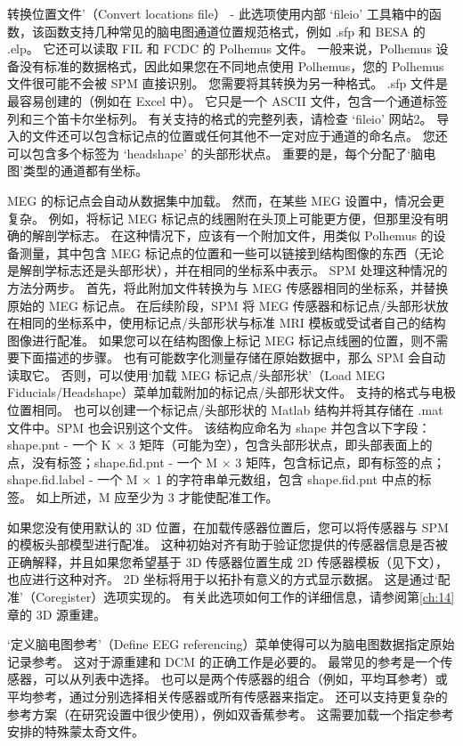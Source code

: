 转换位置文件’（Convert locations file） - 此选项使用内部 ‘fileio’ 工具箱中的函数，该函数支持几种常见的脑电图通道位置规范格式，例如 .sfp 和 BESA 的 .elp。
它还可以读取 FIL 和 FCDC 的 Polhemus 文件。
一般来说，Polhemus 设备没有标准的数据格式，因此如果您在不同地点使用 Polhemus，您的 Polhemus 文件很可能不会被 SPM 直接识别。
您需要将其转换为另一种格式。
.sfp 文件是最容易创建的（例如在 Excel 中）。
它只是一个 ASCII 文件，包含一个通道标签列和三个笛卡尔坐标列。
有关支持的格式的完整列表，请检查 ‘fileio’ 网站2。
导入的文件还可以包含标记点的位置或任何其他不一定对应于通道的命名点。
您还可以包含多个标签为 ‘headshape’ 的头部形状点。
重要的是，每个分配了‘脑电图’类型的通道都有坐标。


MEG 的标记点会自动从数据集中加载。
然而，在某些 MEG 设置中，情况会更复杂。
例如，将标记 MEG 标记点的线圈附在头顶上可能更方便，但那里没有明确的解剖学标志。
在这种情况下，应该有一个附加文件，用类似 Polhemus 的设备测量，其中包含 MEG 标记点的位置和一些可以链接到结构图像的东西（无论是解剖学标志还是头部形状），并在相同的坐标系中表示。
SPM 处理这种情况的方法分两步。
首先，将此附加文件转换为与 MEG 传感器相同的坐标系，并替换原始的 MEG 标记点。
在后续阶段，SPM 将 MEG 传感器和标记点/头部形状放在相同的坐标系中，使用标记点/头部形状与标准 MRI 模板或受试者自己的结构图像进行配准。
如果您可以在结构图像上标记 MEG 标记点线圈的位置，则不需要下面描述的步骤。
也有可能数字化测量存储在原始数据中，那么 SPM 会自动读取它。
否则，可以使用‘加载 MEG 标记点/头部形状’（Load MEG Fiducials/Headshape）菜单加载附加的标记点/头部形状文件。
支持的格式与电极位置相同。
也可以创建一个标记点/头部形状的 Matlab 结构并将其存储在 .mat 文件中。SPM 也会识别这个文件。
该结构应命名为 shape 并包含以下字段：shape.pnt - 一个 K × 3 矩阵（可能为空），包含头部形状点，即头部表面上的点，没有标签；shape.fid.pnt - 一个 M × 3 矩阵，包含标记点，即有标签的点；shape.fid.label - 一个 M × 1 的字符串单元数组，包含 shape.fid.pnt 中点的标签。
如上所述，M 应至少为 3 才能使配准工作。


如果您没有使用默认的 3D 位置，在加载传感器位置后，您可以将传感器与 SPM 的模板头部模型进行配准。
这种初始对齐有助于验证您提供的传感器信息是否被正确解释，并且如果您希望基于 3D 传感器位置生成 2D 传感器模板（见下文），也应进行这种对齐。
2D 坐标将用于以拓扑有意义的方式显示数据。
这是通过‘配准’（Coregister）选项实现的。
有关此选项如何工作的详细信息，请参阅第\ref{ch:14}章的 3D 源重建。


‘定义脑电图参考’（Define EEG referencing）菜单使得可以为脑电图数据指定原始记录参考。
这对于源重建和 DCM 的正确工作是必要的。
最常见的参考是一个传感器，可以从列表中选择。
也可以是两个传感器的组合（例如，平均耳参考）或平均参考，通过分别选择相关传感器或所有传感器来指定。
还可以支持更复杂的参考方案（在研究设置中很少使用），例如双香蕉参考。
这需要加载一个指定参考安排的特殊蒙太奇文件。


